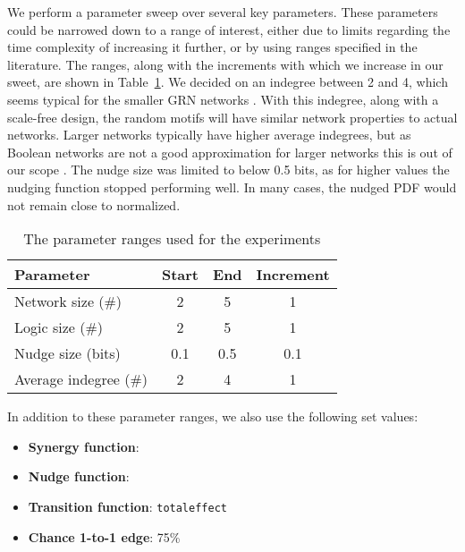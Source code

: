 \documentclass[../main.tex]{subfiles}
\begin{document}
We perform a parameter sweep over several key parameters.
These parameters could be narrowed down to a range of interest, either due to limits regarding the time complexity of increasing it further, or by using ranges specified in the literature.
The ranges, along with the increments with which we increase in our sweet, are shown in Table~\ref{parameters}.
We decided on an indegree between 2 and 4, which seems typical for the smaller GRN networks \cite{lahdesmaki2003learning}.
With this indegree, along with a scale-free design, the random motifs will have similar network properties to actual networks.
Larger networks typically have higher average indegrees, but as Boolean networks are not a good approximation for larger networks this is out of our scope \cite{lahdesmaki2003learning, karlebach2008modelling}.
The nudge size was limited to below 0.5 bits, as for higher values the nudging function stopped performing well.
In many cases, the nudged PDF would not remain close to normalized.

\begin{center}
\begin{table}
\label{parameters}
\caption{The parameter ranges used for the experiments}
\begin{tabular}{| l | c | c | c |}
\hline
Parameter & Start & End & Increment \\
\hline
Network size (\#) & 2 & 5 & 1 \\
Logic size (\#) & 2 & 5 & 1 \\
Nudge size (bits) & 0.1 & 0.5 & 0.1 \\
Average indegree (\#) & 2 & 4 & 1 \\
\hline
\end{tabular}
\end{table}
\end{center}

In addition to these parameter ranges, we also use the following set values:

\begin{itemize}
\item \textbf{Synergy function}: \texttt{}
\item \textbf{Nudge function}: \texttt{}
\item \textbf{Transition function}: \texttt{totaleffect}
\item \textbf{Chance 1-to-1 edge}: 75\% 
\end{itemize}
\end{document}
